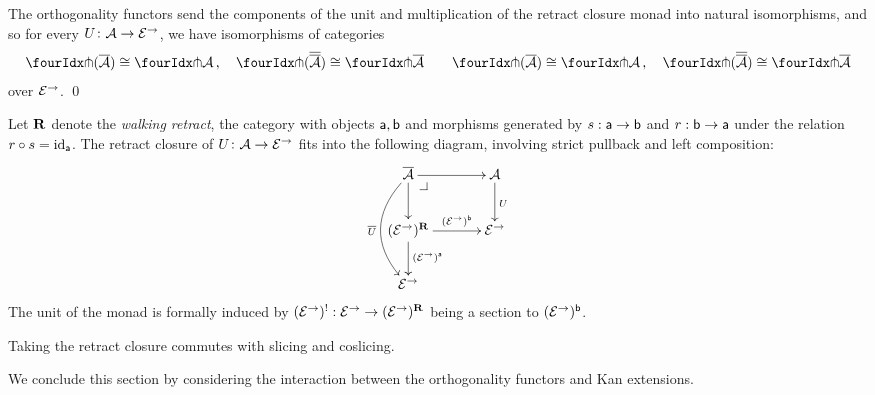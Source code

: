 \documentclass[reqno,10pt,a4paper,oneside]{amsart}
\begin{document}
\begin{proposition}
\label{retract-closure}
The orthogonality functors send the components of the unit and multiplication of the retract closure monad into natural
isomorphisms, and so for every $U \colon \mathcal{A} \to \mathcal{E}^\to$, we have isomorphisms of categories
\begin{gather*} 
 \liftr{(\overline{\cal{A}})} \iso \liftr{\cal{A}} \, , \quad
 \liftr{(\overline{\overline{\cal{A}}})} \iso \liftr{\overline{\cal{A}}}  \qquad
 \liftl{(\overline{\cal{A}})} \iso \liftl{\cal{A}} \, , \quad
 \liftl{(\overline{\overline{\cal{A}}})} \iso \liftl{\overline{\cal{A}}}
\end{gather*} 
over $\mathcal{E}^\to$. \qed
\end{proposition}




\begin{remark} Let $\mathbf{R}$ denote the \emph{walking retract}, \ie the category with objects $\mathsf{a}, \mathsf{b}$ and morphisms generated by $s : \mathsf{a} \to \mathsf{b}$ and $r : \mathsf{b} \to \mathsf{a}$ under the relation $r \mathbin{\circ} s = \operatorname{id}_{\mathsf{a}}$. The retract closure of $U \colon \mathcal{A} \to \mathcal{E}^\to$ fits into the following diagram, involving strict pullback and left composition:
\[
\xymatrix@C+1em{
  \overline{\cal{A}}
  \ar[r]
  \ar[d]
  \ar@/_2em/[dd]_{\overline{U}}
  \pullback{dr}
&
  \cal{A}
  \ar[d]^{U}
\\
  (\catE^{\to})^{\ret}
  \ar[r]^-{(\catE^{\to})^{\retB}}
  \ar[d]^{(\catE^{\to})^{\retA}}
&
  \catE^{\to}
\\
  \catE^{\to}
}
\]
The unit of the monad is formally induced by $(\mathcal{E}^{\to})^{\mathord{!}} : \mathcal{E}^{\to} \to (\mathcal{E}^{\to})^{\mathbf{R}}$ being a section to $(\mathcal{E}^{\to})^{\mathsf{b}}$.
\end{remark}


\begin{remark}
\label{retract-closure-slicing}
Taking the retract closure commutes with slicing and coslicing.
\end{remark}

\medskip

We conclude this section by considering the interaction between the orthogonality functors and  Kan extensions.
\end{document}
